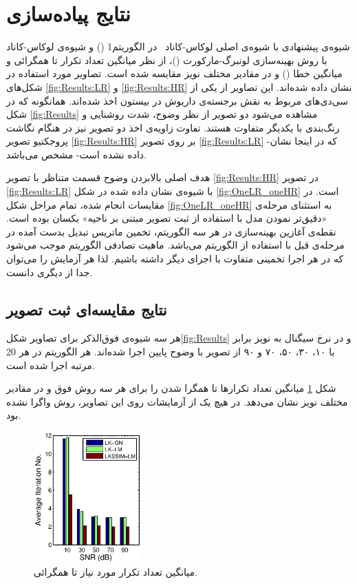 \documentclass[conference]{IEEEtran-ModifiedForMVIP}
\begin{document}
\section{نتایج پیاده‌سازی}\label{Sec:ExperimentalResults}
شیوه‌ی پیشنهادی  با شیوه‌ی اصلی لوکاس-کاناد~\cite{Lucas81iterative} در الگوریتم1 () و شیوه‌ی لوکاس-کاناد با روش بهینه‌سازی لونبرگ-مارکورت\cite{Szeliski96video} ()، از نظر میانگین تعداد تکرار تا همگرائی و میانگین خطا () و در مقادیر مختلف نویز مقایسه شده است. تصاویر مورد استفاده در شکل‌های \ref{fig:Results:LR} و \ref{fig:Results:HR} نشان داده شده‌اند. این تصاویر از یکی از سی‌دی‌های مربوط به نقش برجسته‌ی داریوش در بیستون اخذ شده‌اند. همانگونه که در شکل \ref{fig:Results} مشاهده می‌شود دو تصویر از نظر وضوح، شدت روشنایی و رنگ‌بندی با یکدیگر متفاوت هستند. تفاوت زاویه‌ی اخذ دو تصویر نیز در هنگام نگاشت پروجکتیو تصویر \ref{fig:Results:HR} بر روی تصویر \ref{fig:Results:LR} -که در اینجا نشان داده نشده است- مشخص می‌باشد.

 هدف اصلی بالابردن وضوح قسمت متناظر با تصویر \ref{fig:Results:HR} در تصویر \ref{fig:Results:LR} با شیوه‌ی نشان داده شده در شکل \ref{fig:OneLR_oneHR} است. در مقایسات انجام شده، تمام مراحل شکل \ref{fig:OneLR_oneHR} به استثنای مرحله‌ی «دقیق‌تر نمودن مدل با استفاده از ثبت تصویر مبتنی بر ناحیه» یکسان بوده است. نقطه‌ی آغازین بهینه‌سازی در هر سه الگوریتم، تخمین ماتریس تبدیل بدست آمده در مرحله‌ی قبل با استفاده از الگوریتم  می‌باشد. 
ماهیت تصادفی الگوریتم  موجب می‌شود که در هر اجرا تخمینی متفاوت با اجرای دیگر داشته باشیم. لذا هر 
آزمایش را می‌توان جدا از دیگری دانست. 


\subsection{نتایج مقایسه‌ای ثبت تصویر}
هر سه شیوه‌ی فوق‌الذکر برای تصاویر شکل\ref{fig:Results} و در نرخ سیگنال به نویز برابر با ۱۰، ۳۰، ۵۰، ۷۰ و ۹۰  از تصویر با وضوح پایین اجرا شده‌اند. هر الگوریتم در هر  20 مرتبه اجرا شده است. 

شکل \ref{fig:Conv_Iter} میانگین تعداد تکرارها تا همگرا شدن را برای هر سه روش فوق و در مقادیر مختلف نویز نشان می‌دهد. در هیچ یک از آزمایشات روی این تصاویر، روش  واگرا نشده بود.

\begin{figure}[tp]
\centering
\includegraphics*[height=50mm, width = 0.7\columnwidth]{Images/Afsaran_mean_conv_iter.eps}
\caption{ میانگین تعداد تکرار مورد نیاز تا همگرائی.}
\label{fig:Conv_Iter}
\end{figure}
\end{document}
